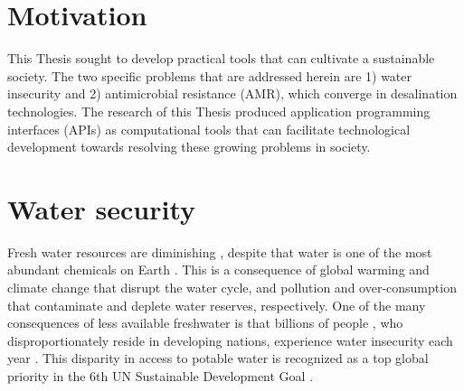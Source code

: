 
\section{Motivation}
This Thesis sought to develop practical tools that can cultivate a sustainable society. The two specific problems that are addressed herein are 1) water insecurity and 2) antimicrobial resistance (AMR), which converge in desalination technologies. The research of this Thesis produced application programming interfaces (APIs) as computational tools that can facilitate technological development towards resolving these growing problems in society.

\section{Water security}
Fresh water resources are diminishing \cite{Laghari2013MeltingUncertainty,Rasul2008GlobalRanges}, despite that water is one of the most abundant chemicals on Earth \cite{Shiklomanov1993WorldResources}. This is a consequence of global warming \cite{Hansen2006GlobalChange,IPCC2018Global1.5C} and climate change \cite{Thomas2004ExtinctionChange} that disrupt the water cycle, and pollution \cite{Pappas2017EnergySuperpower,Zhao2016DecouplingInvestment,Moller2010DistributionWatershed} and over-consumption \cite{Bongaarts2009HumanTransition,Meyer1992HumanChange} that contaminate and deplete water reserves, respectively. One of the many consequences of less available freshwater is that billions of people \cite{Unicef2017ThirstingClimate}, who disproportionately reside in developing nations, experience water insecurity each year \cite{Hoekstra2012GlobalAvailability}. This disparity in access to potable water is recognized as a top global priority in the 6th UN Sustainable Development Goal \cite{Jones2018TheOutlook}. 

